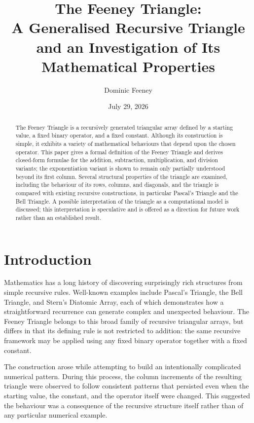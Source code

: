 \documentclass[11pt]{article}
\title{The Feeney Triangle:\\ A Generalised Recursive Triangle and an Investigation of Its Mathematical Properties}
\author{Dominic Feeney}
\date{July 29, 2026}
\theoremstyle{definition}
\begin{document}
\maketitle

\begin{abstract}
The Feeney Triangle is a recursively generated triangular array defined by a starting value, a fixed binary operator, and a fixed constant. Although its construction is simple, it exhibits a variety of mathematical behaviours that depend upon the chosen operator. This paper gives a formal definition of the Feeney Triangle and derives closed-form formulae for the addition, subtraction, multiplication, and division variants; the exponentiation variant is shown to remain only partially understood beyond its first column. Several structural properties of the triangle are examined, including the behaviour of its rows, columns, and diagonals, and the triangle is compared with existing recursive constructions, in particular Pascal's Triangle and the Bell Triangle. A possible interpretation of the triangle as a computational model is discussed; this interpretation is speculative and is offered as a direction for future work rather than an established result.
\end{abstract}

\tableofcontents

\section{Introduction}

Mathematics has a long history of discovering surprisingly rich structures from simple recursive rules. Well-known examples include Pascal's Triangle, the Bell Triangle, and Stern's Diatomic Array, each of which demonstrates how a straightforward recurrence can generate complex and unexpected behaviour. The Feeney Triangle belongs to this broad family of recursive triangular arrays, but differs in that its defining rule is not restricted to addition: the same recursive framework may be applied using any fixed binary operator together with a fixed constant.

The construction arose while attempting to build an intentionally complicated numerical pattern. During this process, the column increments of the resulting triangle were observed to follow consistent patterns that persisted even when the starting value, the constant, and the operator itself were changed. This suggested the behaviour was a consequence of the recursive structure itself rather than of any particular numerical example.
\end{document}
